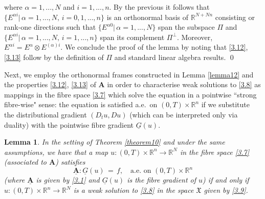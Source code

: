 \documentclass{amsart}
\newtheorem{lemma}[theorem]{Lemma}
\theoremstyle{definition}
\numberwithin{equation}{section}
\begin{document}
where ${\alpha}=1,...,N$ and $i=1,...,n$. By the previous it follows that $\{E^{{\alpha} i}|\, {\alpha}=1,...,N,\,i=0,1,...,n\}$ is an orthonormal basis of ${\mathbb{R}}^{N+Nn}$ consisting or rank-one directions such that $\{E^{{\alpha} 0}|\, {\alpha}=1,...,N\}$ span the subspace $\Pi$ and $\{E^{{\alpha} i}|\, {\alpha}=1,...,N,\,i=1,...,n\}$ span its complement $\Pi^\bot$. Moreover, $E^{{\alpha} i}=E^{\alpha} {\otimes} E^{({\alpha})i}$. We conclude the proof of the lemma by noting that \eqref{3.12}, \eqref{3.13} follow by the definition of $\Pi$ and standard linear algebra results.     \qed

{\medskip}

Next, we employ the orthonormal frames constructed in Lemma \ref{lemma12} and the properties \eqref{3.12}, \eqref{3.13} of ${\textbf{A}}$ in order to characterise weak solutions to \eqref{3.8} as mappings in the fibre space \eqref{3.7} which solve the equation in a pointwise ``strong fibre-wise" sense: the equation is satisfied a.e.\ on $(0,T)\! {\times} {\mathbb{R}}^n $ if we substitute the distributional gradient $(D_t u, Du)$ (which can be interpreted only via duality) with the pointwise fibre gradient $\underline{G}(u)$. 

\begin{lemma} \label{lemma14} In the setting of Theorem \ref{theorem10} and under the same assumptions, we have that a map $u :  (0,T)\! {\times} \!{\mathbb{R}}^n {\longrightarrow} {\mathbb{R}}^N $ in the fibre space \eqref{3.7} (associated to ${\textbf{A}}$) satisfies 
\[
{\underline{\textbf{A}}} {\!:\!} \underline{G}(u)\, =\, f, \ \ \ \text{ a.e.\ on }(0,T){\times} {\mathbb{R}}^n
\]
(where ${\underline{\textbf{A}}}$ is given by \eqref{3.1} and $\underline{G}(u)$ is the fibre gradient of $u$) if and only if $u :  (0,T)\! {\times} \!{\mathbb{R}}^n {\longrightarrow} {\mathbb{R}}^N $ is a weak solution to \eqref{3.8} in the space $\mathfrak{X}$ given by \eqref{3.9}.
\end{lemma}
\end{document}
